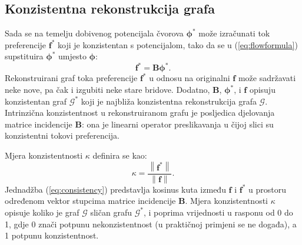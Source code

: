 \documentclass[lmodern, utf8, diplomski, numeric]{fer}
\newcommand{\matr}[1]{\mathbold{#1}}
\newcommand{\graph}[1]{\mathcal{#1}}
\newcommand{\q}{\left}
\newcommand{\w}{\right}
\begin{document}
  \subsection{Konzistentna rekonstrukcija grafa}
  \label{sec:reconstruct}
  Sada se na temelju dobivenog potencijala čvorova $\matr{\phi^*}$ može izračunati tok preferencije $\matr{f^*}$ koji je konzistentan s potencijalom, tako da se u (\ref{eq:flowformula}) supstituira $\matr{\phi^*}$ umjesto $\matr{\phi}$:
  \begin{equation}
  \matr{f^*} = \matr{B} \matr{\phi^*}.
  \end{equation}
  Rekonstruirani graf toka preferencije $\matr{f^*}$ u odnosu na originalni $\matr{f}$ može sadržavati neke nove, pa čak i izgubiti neke stare bridove.
  Dodatno, $\matr{B}$, $\matr{\phi^*}$, i $\matr{f}$ opisuju konzistentan graf $\graph{G}^*$ koji je najbliža konzistentna rekonstrukcija grafa $\graph{G}$.
  Intrinzična konzistentnost u rekonstruiranom grafu je posljedica djelovanja matrice incidencije $\matr B$: ona je linearni operator preslikavanja u čijoj slici su konzistentni tokovi preferencija.
  
  Mjera konzistentnosti $\kappa$ definira se kao:
  \begin{equation}
  \label{eq:consistency}
  \kappa = \frac{\q \lVert \matr{f^*} \w \rVert}{\q \lVert \matr{f} \w \rVert}.
  \end{equation}
  Jednadžba (\ref{eq:consistency}) predstavlja kosinus kuta između $\matr{f}$ i $\matr{f^*}$ u prostoru određenom vektor stupcima matrice incidencije $\matr{B}$.
  Mjera konzistentnosti $\kappa$ opisuje koliko je graf $\graph{G}$ sličan grafu $\graph{G}^*$, i poprima vrijednosti u rasponu od 0 do 1, gdje 0 znači potpunu nekonzistentnost (u praktičnoj primjeni se ne događa), a 1 potpunu konzistentnost.
  
\end{document}
